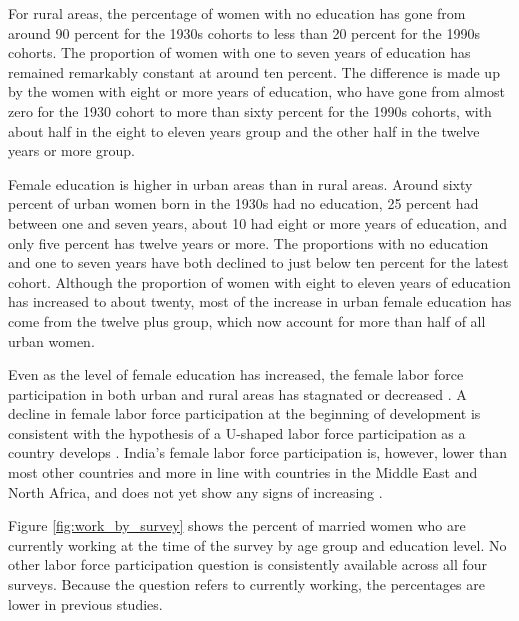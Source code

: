 \documentclass[12pt,letterpaper]{article}
\begin{document}
For rural areas, the percentage of women with no education has gone from around 90 percent
for the 1930s cohorts to less than 20 percent for the 1990s cohorts. 
The proportion of women with one to seven years of education has remained remarkably
constant at around ten percent.
The difference is made up by the women with eight or more years of education, who have
gone from almost zero for the 1930 cohort to more than sixty percent for the 1990s cohorts,
with about half in the eight to eleven years group and 
the other half in the twelve years or more group.

Female education is higher in urban areas than in rural areas.
Around sixty percent of urban women born in the 1930s had no education, 25 percent had
between one and seven years, about 10 had eight or more years of education, and only
five percent has twelve years or more.
The proportions with no education and one to seven years have both declined to just below 
ten percent for the latest cohort.
Although the proportion of women with eight to eleven years of education has increased
to about twenty, most of the increase in urban female education has come from the 
twelve plus group, which now account for more than half of all urban women.

Even as the level of female education has increased, the female labor force participation 
in both urban and rural areas has stagnated or decreased
\citep{Klasen2015,Fletcher2017,Afridi2018,Bhargava2018,Chatterjee2018,Bhargava2019}.
A decline in female labor force participation at the beginning of development is
consistent with the hypothesis of a U-shaped labor force participation as a country
develops \citep{Goldin1994}.
India's female labor force participation is, however, lower than most other
countries and more in line with countries in the Middle East and North Africa, and
does not yet show any signs of increasing
\citep{Klasen2015,Chatterjee2018}.

Figure \ref{fig:work_by_survey} shows the percent of married women who are 
currently working at the time of the survey by age group and education level.
No other labor force participation question is consistently available across all 
four surveys. 
Because the question refers to currently working, the percentages are lower in previous
studies. 
\end{document}
